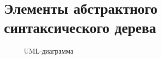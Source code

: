\section*{Элементы абстрактного синтаксического дерева}

\begin{figure}
    \centering
    
    \caption{UML-диаграмма }
    \label{fig:ast_nodes}
\end{figure}

